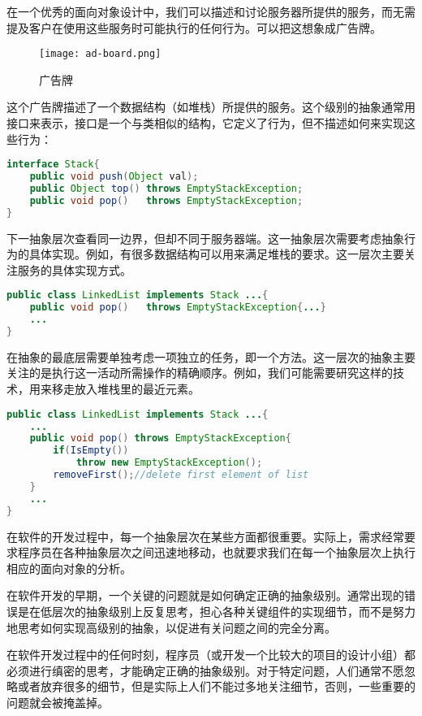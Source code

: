 在一个优秀的面向对象设计中，我们可以描述和讨论服务器所提供的服务，而无需提及客户在使用这些服务时可能执行的任何行为。可以把这想象成广告牌。


\begin{figure}[htbp]
\centering
\texttt{[image: ad-board.png]}
\caption{广告牌}
\label{fig:ad-board}
\end{figure}

这个广告牌描述了一个数据结构（如堆栈）所提供的服务。这个级别的抽象通常用接口来表示，接口是一个与类相似的结构，它定义了行为，但不描述如何来实现这些行为：

\begin{lstlisting}[language=Java]
interface Stack{
	public void push(Object val);
	public Object top()	throws EmptyStackException;
	public void pop()	throws EmptyStackException;
}
\end{lstlisting}


下一抽象层次查看同一边界，但却不同于服务器端。这一抽象层次需要考虑抽象行为的具体实现。例如，有很多数据结构可以用来满足堆栈的要求。这一层次主要关注服务的具体实现方式。

\begin{lstlisting}[language=Java]
public class LinkedList implements Stack ...{
	public void pop()	throws EmptyStackException{...}
	...
}
\end{lstlisting}


在抽象的最底层需要单独考虑一项独立的任务，即一个方法。这一层次的抽象主要关注的是执行这一活动所需操作的精确顺序。例如，我们可能需要研究这样的技术，用来移走放入堆栈里的最近元素。

\begin{lstlisting}[language=Java]
public class LinkedList implements Stack ...{
	...
	public void pop() throws EmptyStackException{
		if(IsEmpty())
			throw new EmptyStackException();
		removeFirst();//delete first element of list
	}
	...	
}
\end{lstlisting}

在软件的开发过程中，每一个抽象层次在某些方面都很重要。实际上，需求经常要求程序员在各种抽象层次之间迅速地移动，也就要求我们在每一个抽象层次上执行相应的面向对象的分析。

在软件开发的早期，一个关键的问题就是如何确定正确的抽象级别。通常出现的错误是在低层次的抽象级别上反复思考，担心各种关键组件的实现细节，而不是努力地思考如何实现高级别的抽象，以促进有关问题之间的完全分离。

在软件开发过程中的任何时刻，程序员（或开发一个比较大的项目的设计小组）都必须进行缜密的思考，才能确定正确的抽象级别。对于特定问题，人们通常不愿忽略或者放弃很多的细节，但是实际上人们不能过多地关注细节，否则，一些重要的问题就会被掩盖掉。


